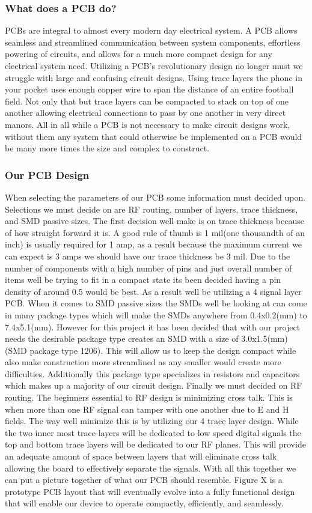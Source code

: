 \subsubsection{What does a PCB do?}
PCBs are integral to almost every modern day electrical system. A PCB allows seamless and streamlined communication between system components, effortless powering of circuits, and allows for a much more compact design for any electrical system need. Utilizing a PCB's revolutionary design no longer must we struggle with large and confusing circuit designs. Using trace layers the phone in your pocket uses enough copper wire to span the distance of an entire football field. Not only that but trace layers can be compacted to stack on top of one another allowing electrical connections to pass by one another in very direct manors. All in all while a PCB is not necessary to make circuit designs work, without them any system that could otherwise be implemented on a PCB would be many more times the size and complex to construct.
\subsubsection{Our PCB Design}
When selecting the parameters of our PCB some information must decided upon. Selections we must decide on are RF routing, number of layers, trace thickness, and SMD passive sizes. The first decision well make is on trace thickness because of how straight forward it is. A good rule of thumb is 1 mil(one thousandth of an inch) is usually required for 1 amp, as a result because the maximum current we can expect is 3 amps we should have our trace thickness be 3 mil. Due to the number of components with a high number of pins and just overall number of items well be trying to fit in a compact state its been decided having a pin density of around 0.5 would be best. As a result well be utilizing a 4 signal layer PCB. When it comes to SMD passive sizes the SMDs well be looking at can come in many package types which will make the SMDs anywhere from 0.4x0.2(mm) to 7.4x5.1(mm). However for this project it has been decided that with our project needs the desirable package type creates an SMD with a size of 3.0x1.5(mm)(SMD package type 1206). This will allow us to keep the design compact while also make construction more streamlined as any smaller would create more difficulties. Additionally this package type specializes in resistors and capacitors which makes up a majority of our circuit design. Finally we must decided on RF routing. The beginners essential to RF design is minimizing cross talk. This is when more than one RF signal can tamper with one another due to E and H fields. The way well minimize this is by utilizing our 4 trace layer design. While the two inner most trace layers will be dedicated to low speed digital signals the top and bottom trace layers will be dedicated to our RF planes. This will provide an adequate amount of space between layers that will eliminate cross talk allowing the board to effectively separate the signals. With all this together we can put a picture together of what our PCB should resemble. Figure X is a prototype PCB layout that will eventually evolve into a fully functional design that will enable our device to operate compactly, efficiently, and seamlessly.